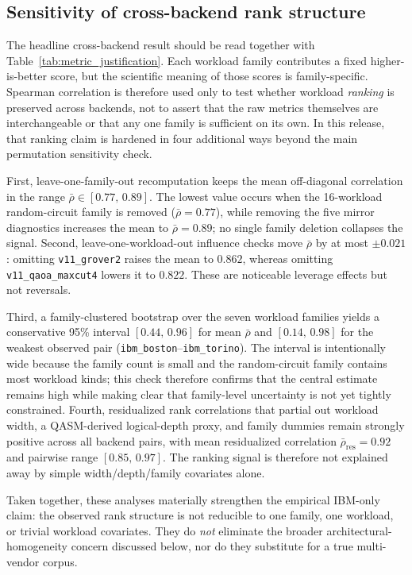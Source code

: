 \documentclass[aps,prxquantum,twocolumn,superscriptaddress,amsmath,amssymb,longbibliography,floatfix]{revtex4-2}
\begin{document}
\subsection{Sensitivity of cross-backend rank structure}
\label{sec:sensitivity}

The headline cross-backend result should be read together with Table~\ref{tab:metric_justification}. Each workload family contributes a fixed higher-is-better score, but the scientific meaning of those scores is family-specific. Spearman correlation is therefore used only to test whether workload \emph{ranking} is preserved across backends, not to assert that the raw metrics themselves are interchangeable or that any one family is sufficient on its own. In this release, that ranking claim is hardened in four additional ways beyond the main permutation sensitivity check.

First, leave-one-family-out recomputation keeps the mean off-diagonal correlation in the range $\bar{\rho} \in [0.77,\,0.89]$. The lowest value occurs when the 16-workload random-circuit family is removed ($\bar{\rho}=0.77$), while removing the five mirror diagnostics increases the mean to $\bar{\rho}=0.89$; no single family deletion collapses the signal. Second, leave-one-workload-out influence checks move $\bar{\rho}$ by at most $\pm 0.021$: omitting \texttt{v11\_grover2} raises the mean to $0.862$, whereas omitting \texttt{v11\_qaoa\_maxcut4} lowers it to $0.822$. These are noticeable leverage effects but not reversals.

Third, a family-clustered bootstrap over the seven workload families yields a conservative 95\% interval $[0.44,\,0.96]$ for mean $\bar{\rho}$ and $[0.14,\,0.98]$ for the weakest observed pair (\texttt{ibm\_boston}--\texttt{ibm\_torino}). The interval is intentionally wide because the family count is small and the random-circuit family contains most workload kinds; this check therefore confirms that the central estimate remains high while making clear that family-level uncertainty is not yet tightly constrained. Fourth, residualized rank correlations that partial out workload width, a QASM-derived logical-depth proxy, and family dummies remain strongly positive across all backend pairs, with mean residualized correlation $\bar{\rho}_{\mathrm{res}} = 0.92$ and pairwise range $[0.85,\,0.97]$. The ranking signal is therefore not explained away by simple width/depth/family covariates alone.

Taken together, these analyses materially strengthen the empirical IBM-only claim: the observed rank structure is not reducible to one family, one workload, or trivial workload covariates. They do \emph{not} eliminate the broader architectural-homogeneity concern discussed below, nor do they substitute for a true multi-vendor corpus.
\end{document}

